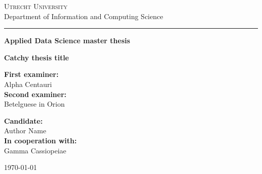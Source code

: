 
\begin{titlepage}

\begin{center}
{\scshape \Large
Utrecht University\\
}
\vspace{4mm}
{\Large
Department of Information and Computing Science
}
\vspace{8mm}
\hrule
\vspace{4mm}
\begin{spacing}{1.8}
{\large\textbf{
Applied Data Science master thesis
}}
\end{spacing}
\vspace{42mm}

\begin{spacing}{2.0}
{\Large \bf Catchy thesis title}\\
\end{spacing}
\end{center}

\vfill
\noindent
\begin{minipage}[t]{0.5\textwidth}
\large
\textbf{First examiner:
}\\
Alpha Centauri\\
 \vspace{5mm}
\textbf{Second examiner:}\\
Betelguese in Orion\\
\end{minipage}
\hfill
\begin{minipage}[t]{0.5\textwidth}\raggedleft
\large
\textbf{Candidate:}\\
Author Name\\
 \vspace{5mm}
\textbf{In cooperation with:}\\
Gamma Cassiopeiae\\
\end{minipage}

\vspace{24mm}

\begin{center}
\large \today
\end{center}

\end{titlepage}
\restoregeometry